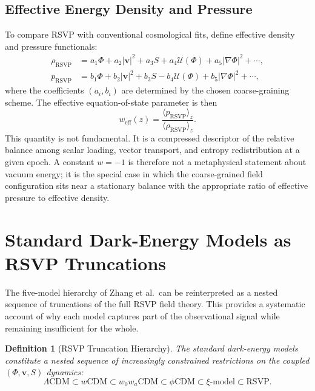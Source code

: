 \documentclass[12pt,a4paper]{article}
\newtheorem{definition}[theorem]{Definition}
\theoremstyle{remark}
\newcommand{\vv}{\mathbf{v}}
\newcommand{\rhoRSVP}{\rho_{\mathrm{RSVP}}}
\newcommand{\pRSVP}{p_{\mathrm{RSVP}}}
\newcommand{\weff}{w_{\mathrm{eff}}}
\begin{document}
\subsection{Effective Energy Density and Pressure}

To compare RSVP with conventional cosmological fits, define effective density and pressure functionals:
\begin{align}
\rhoRSVP &= a_1 \Phi + a_2 |\vv|^2 + a_3 S + a_4 \mathcal{U}(\Phi) + a_5 |\nabla \Phi|^2 + \cdots, \\
\pRSVP &= b_1 \Phi + b_2 |\vv|^2 + b_3 S - b_4 \mathcal{U}(\Phi) + b_5 |\nabla \Phi|^2 + \cdots,
\end{align}
where the coefficients $(a_i, b_i)$ are determined by the chosen coarse-graining scheme. The effective equation-of-state parameter is then
\begin{equation}
\weff(z) = \frac{\langle \pRSVP \rangle_z}{\langle \rhoRSVP \rangle_z}.
\end{equation}
This quantity is not fundamental. It is a compressed descriptor of the relative balance among scalar loading, vector transport, and entropy redistribution at a given epoch. A constant $w = -1$ is therefore not a metaphysical statement about vacuum energy; it is the special case in which the coarse-grained field configuration sits near a stationary balance with the appropriate ratio of effective pressure to effective density.

\section{Standard Dark-Energy Models as RSVP Truncations}
\label{sec:truncation}

The five-model hierarchy of Zhang et al.\ can be reinterpreted as a nested sequence of truncations of the full RSVP field theory. This provides a systematic account of why each model captures part of the observational signal while remaining insufficient for the whole.

\begin{definition}[RSVP Truncation Hierarchy]
The standard dark-energy models constitute a nested sequence of increasingly constrained restrictions on the coupled $(\Phi, \vv, S)$ dynamics:
\begin{equation}
\Lambda\mathrm{CDM} \subset w\mathrm{CDM} \subset w_0w_a\mathrm{CDM} \subset \phi\mathrm{CDM} \subset \xi\text{-model} \subset \mathrm{RSVP}.
\label{eq:hierarchy}
\end{equation}
\end{definition}
\end{document}
